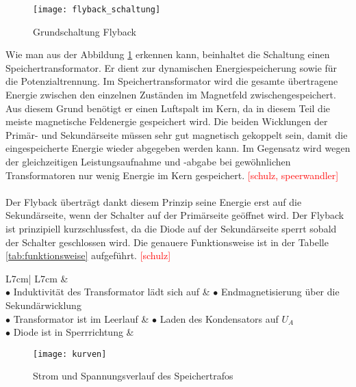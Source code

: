 \begin{figure}[h]
\centering
\texttt{[image: flyback\_schaltung]}
\caption{Grundschaltung Flyback}\label{fig:flyback_schaltung}
\end{figure}

Wie man aus der Abbildung \ref{fig:flyback_schaltung} erkennen kann, beinhaltet die Schaltung einen Speichertransformator. Er dient zur dynamischen Energiespeicherung sowie für die Potenzialtrennung. Im Speichertransformator wird die gesamte übertragene Energie zwischen den einzelnen Zuständen im Magnetfeld zwischengespeichert. Aus diesem Grund benötigt er einen Luftspalt im Kern, da in diesem Teil die meiste magnetische Feldenergie gespeichert wird. Die beiden Wicklungen der Primär- und Sekundärseite müssen sehr gut magnetisch gekoppelt sein, damit die eingespeicherte Energie wieder abgegeben werden kann. Im Gegensatz wird wegen der gleichzeitigen Leistungsaufnahme und -abgabe bei gewöhnlichen Transformatoren nur wenig Energie im Kern gespeichert.  \textcolor{red}{[schulz, speerwandler]}
\\\\
Der Flyback überträgt dankt diesem Prinzip seine Energie erst auf die Sekundärseite, wenn der Schalter auf der Primärseite geöffnet wird. Der Flyback ist prinzipiell kurzschlussfest, da die Diode auf der Sekundärseite sperrt sobald der Schalter geschlossen wird. Die genauere Funktionsweise ist in der Tabelle \ref{tab:funktionsweise} aufgeführt. \textcolor{red}{[schulz]}

\begin{table}[h]
	\centering
	\begin{tabular}{L{7cm}| L{7cm} }
		&  \\ \hline\hline
		$ \bullet $ Induktivität des Transformator lädt sich auf & $ \bullet $ Endmagnetisierung über die Sekundärwicklung \\ 
		$ \bullet $ Transformator ist im Leerlauf & $ \bullet $ Laden des Kondensators auf $ U_{A} $ \\ 
		$ \bullet $ Diode ist in Sperrrichtung &  \\ \hline
	\end{tabular}
	\caption{Funktionsweise des Flybacks \textcolor{red}{[schulz]}}\label{tab:funktionsweise}
\end{table}

\begin{figure}[h]
	\centering
	\texttt{[image: kurven]}
	\caption{Strom und Spannungsverlauf des Speichertrafos}\label{fig:kurven}
\end{figure}

